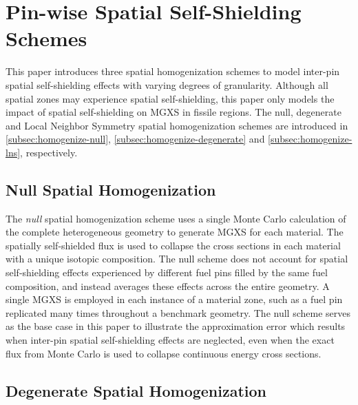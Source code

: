 \section{Pin-wise Spatial Self-Shielding Schemes}
\label{sec:pin-wise-shielding}

This paper introduces three spatial homogenization schemes to model inter-pin spatial self-shielding effects with varying degrees of granularity. Although all spatial zones may experience spatial self-shielding, this paper only models the impact of spatial self-shielding on MGXS in fissile regions. The null, degenerate and Local Neighbor Symmetry spatial homogenization schemes are introduced in \autoref{subsec:homogenize-null}, \autoref{subsec:homogenize-degenerate} and \autoref{subsec:homogenize-lns}, respectively.


\subsection{Null Spatial Homogenization}
\label{subsec:homogenize-null}

The \textit{null} spatial homogenization scheme uses a single Monte Carlo calculation of the complete heterogeneous geometry to generate MGXS for each material. The spatially self-shielded flux is used to collapse the cross sections in each material with a unique isotopic composition. The null scheme does not account for spatial self-shielding effects experienced by different fuel pins filled by the same fuel composition, and instead averages these effects across the entire geometry. A single MGXS is employed in each instance of a material zone, such as a fuel pin replicated many times throughout a benchmark geometry. The null scheme serves as the base case in this paper to illustrate the approximation error which results when inter-pin spatial self-shielding effects are neglected, even when the exact flux from Monte Carlo is used to collapse continuous energy cross sections.


\subsection{Degenerate Spatial Homogenization}
\label{subsec:homogenize-degenerate}

